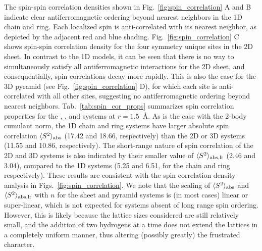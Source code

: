\documentclass[aip,jcp,amsmath,amssymb, preprint]{revtex4-1}
\begin{document}
The spin-spin correlation densities shown in Fig.~\ref{fig:spin_correlation} A and B indicate clear  antiferromagnetic ordering beyond nearest neighbors in the 1D chain and ring.
Each localized spin is anti-correlated with its nearest neighbor, as depicted by the adjacent red and blue shading. 
Fig.~\ref{fig:spin_correlation} C shows spin-spin correlation density for the four symmetry unique sites in the 2D sheet. 
In contrast to the 1D models, it can be seen that there is no way to simultaneously satisfy all antiferromagnetic interactions for the 2D sheet, and consequentially, spin correlations decay more rapidly. 
This is also the case for the 3D pyramid (see Fig.~\ref{fig:spin_correlation} D), for which each site is anti-correlated with all other sites, suggesting no antiferromagnetic ordering beyond nearest neighbors.
Tab.~\ref{tab:spin_cor_props} summarizes spin correlation properties for the , , and  systems at $r=1.5$~{\AA}. 
As is the case with the 2-body cumulant norm, the  1D chain and ring systems have larger absolute spin correlation $\langle S^2 \rangle_{\rm{abs}}$ (17.42 and 18.66, respectively) than the 2D or 3D systems (11.55 and 10.86, respectively).
The short-range nature of spin correlation of the 2D and 3D   systems is also indicated by their smaller value of  $\langle S^2 \rangle_{\rm{abs,lr}}$ (2.46 and 3.04), compared to the 1D systems (5.25 and 6.51, for the chain and ring respectively).
These results are consistent with the spin correlation density analysis in Figs.~\ref{fig:spin_correlation}.
We note that the scaling of $\langle S^2 \rangle_{\rm{abs}}$ and $\langle S^2 \rangle_{\rm{abs,lr}}$ with $n$ for the sheet and pyramid systems is (in most cases) linear or super-linear, which is not expected for systems absent of long range spin ordering. 
However, this is likely because the lattice sizes considered are still relatively small, and the addition of two hydrogens at a time does not extend the lattices in a completely uniform manner, thus altering (possibly greatly) the frustrated character. 
\end{document}
